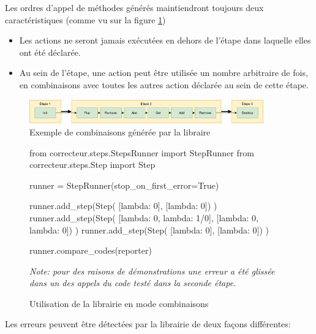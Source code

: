 \documentclass[a4paper]{report}
\begin{document}
Les ordres d'appel de méthodes générés maintiendront toujours deux caractéristiques (comme vu sur la figure \ref{fig:combinainaison_util_example})
\begin{itemize}
\item Les actions ne seront jamais exécutées en dehors de l'étape dans laquelle elles ont été déclarée.
\item Au sein de l'étape, une action peut être utilisée un nombre arbitraire de fois, en combinaisons avec toutes les autres action déclarée au sein de cette étape.
\end{itemize}

\begin{figure}[ht]
	\begin{center}
		\includegraphics[width=0.9\textwidth]{img/combinator_exec.png} 
	\end{center}
	\caption{Exemple de combinaisons générée par la libraire}
	\label{fig:combinainaison_util_example}
\end{figure}

\begin{figure}[ht]
\begin{python}
from correcteur.steps.StepsRunner import StepRunner
from correcteur.steps.Step import Step

runner = StepRunner(stop_on_first_error=True)

runner.add_step(Step(
	[lambda: 0],
	[lambda: 0])
)
runner.add_step(Step(
	[lambda: 0, lambda: 1/0],
	[lambda: 0, lambda: 0])
)
runner.add_step(Step(
	[lambda: 0],
	[lambda: 0])
)

runner.compare_codes(reporter)
\end{python}
	\caption{Utilisation de la librairie en mode combinaisons}
	
	\textit{Note: pour des raisons de démonstrations une erreur a été glissée dans un des appels du code testé dans la seconde étape.}	
	
	\label{fig:combinaisons_ref}
\end{figure}


Les erreurs peuvent être détectées par la librairie de deux façons différentes:
\end{document}
